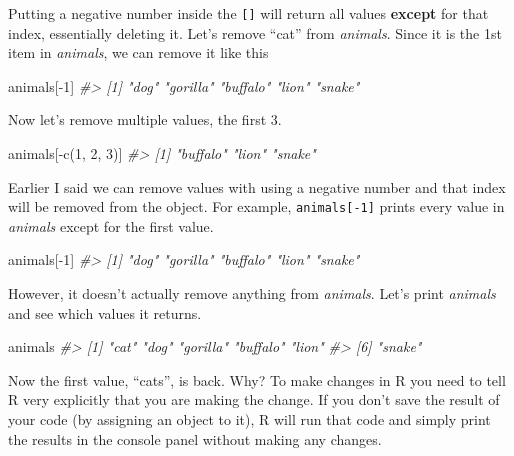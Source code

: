 \documentclass[
]{krantz}
\makeatletter
\newenvironment{Shaded}{\begin{snugshade}}{\end{snugshade}}
\newcommand{\CommentTok}[1]{\textcolor[rgb]{0.37,0.37,0.37}{\textit{#1}}}
\newcommand{\DecValTok}[1]{\textcolor[rgb]{0.06,0.06,0.06}{#1}}
\newcommand{\FunctionTok}[1]{\textcolor[rgb]{0,0,0}{#1}}
\newcommand{\NormalTok}[1]{#1}
\newcommand{\SpecialCharTok}[1]{\textcolor[rgb]{0,0,0}{#1}}
\newenvironment{kframe}{%
\medskip{}
\setlength{\fboxsep}{.8em}
 \def\at@end@of@kframe{}%
 \ifinner\ifhmode%
  \def\at@end@of@kframe{\end{minipage}}%
  \begin{minipage}{\columnwidth}%
 \fi\fi%
 \def\FrameCommand##1{\hskip\@totalleftmargin \hskip-\fboxsep
 \colorbox{shadecolor}{##1}\hskip-\fboxsep
     \hskip-\linewidth \hskip-\@totalleftmargin \hskip\columnwidth}%
 \MakeFramed {\advance\hsize-\width
   \@totalleftmargin\z@ \linewidth\hsize
   \@setminipage}}%
 {\par\unskip\endMakeFramed%
 \at@end@of@kframe}
\renewenvironment{Shaded}{\begin{kframe}}{\end{kframe}}
\makeatother
\begin{document}
Putting a negative number inside the \texttt{{[}{]}} will return all values \textbf{except} for that index, essentially deleting it. Let's remove ``cat'' from \emph{animals}. Since it is the 1st item in \emph{animals}, we can remove it like this

\begin{Shaded}
\begin{Highlighting}[]
\NormalTok{animals[}\SpecialCharTok{{-}}\DecValTok{1}\NormalTok{]}
\CommentTok{\#\textgreater{} [1] "dog"     "gorilla" "buffalo" "lion"    "snake"}
\end{Highlighting}
\end{Shaded}

Now let's remove multiple values, the first 3.

\begin{Shaded}
\begin{Highlighting}[]
\NormalTok{animals[}\SpecialCharTok{{-}}\FunctionTok{c}\NormalTok{(}\DecValTok{1}\NormalTok{, }\DecValTok{2}\NormalTok{, }\DecValTok{3}\NormalTok{)]}
\CommentTok{\#\textgreater{} [1] "buffalo" "lion"    "snake"}
\end{Highlighting}
\end{Shaded}

Earlier I said we can remove values with using a negative number and that index will be removed from the object. For example, \texttt{animals{[}-1{]}} prints every value in \emph{animals} except for the first value.

\begin{Shaded}
\begin{Highlighting}[]
\NormalTok{animals[}\SpecialCharTok{{-}}\DecValTok{1}\NormalTok{]}
\CommentTok{\#\textgreater{} [1] "dog"     "gorilla" "buffalo" "lion"    "snake"}
\end{Highlighting}
\end{Shaded}

However, it doesn't actually remove anything from \emph{animals}. Let's print \emph{animals} and see which values it returns.

\begin{Shaded}
\begin{Highlighting}[]
\NormalTok{animals}
\CommentTok{\#\textgreater{} [1] "cat"     "dog"     "gorilla" "buffalo" "lion"   }
\CommentTok{\#\textgreater{} [6] "snake"}
\end{Highlighting}
\end{Shaded}

Now the first value, ``cats'', is back. Why? To make changes in R you need to tell R very explicitly that you are making the change. If you don't save the result of your code (by assigning an object to it), R will run that code and simply print the results in the console panel without making any changes.
\end{document}

